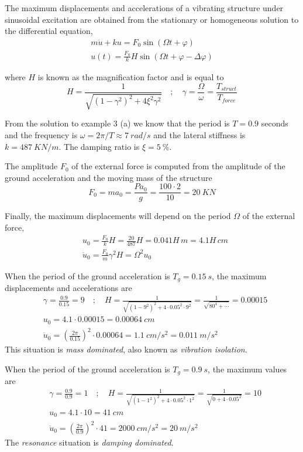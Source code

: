\begin{Answer}[ref={frame_ground_acceleration}]
The maximum displacements and accelerations of a vibrating structure under sinusoidal excitation are obtained from the stationary or homogeneous solution to the differential equation,
\begin{align*}
m\ddot{u} + ku = F_0\sin(\Omega t + \varphi) \\
u(t) = \frac{F_0}{k}H\sin(\Omega t + \varphi - \Delta\varphi)
\end{align*}

where $H$ is known as the magnification factor and is equal to
$$
H = \frac{1}{\sqrt{(1-\gamma^2)^2 + 4\xi^2\gamma^2}} \quad ; \quad
\gamma = \frac{\Omega}{\omega} = \frac{T_{struct}}{T_{force}}
$$

From the solution to example 3 (a) we know that the period is $T=0.9$ seconds and the frequency is $\omega = 2\pi/T \approx \SI{7}{rad/s}$ and the lateral stiffness is $k=\SI{487}{KN/m}$. The damping ratio is $\xi=\SI{5}{\%}$.

The amplitude $F_0$ of the external force is computed from the amplitude of the ground acceleration and the moving mass of the structure
$$
F_0 = ma_{0} = \frac{Pa_0}{g} = \frac{100\cdot2}{10} = \SI{20}{KN}
$$

Finally, the maximum displacements will depend on the period $\Omega$ of the external force,
\begin{align*}
&u_0 = \frac{F_0}{k}H = \frac{20}{487}H = 0.041H\,\si{m} = 4.1H\,\si{cm} \\
&\ddot{u}_0 = \frac{F_0}{m}\gamma^2H = \Omega^2u_0
\end{align*}


When the period of the ground acceleration is $T_g=\SI{0.15}{s}$, the maximum displacements and accelerations are
\begin{align*}
&\gamma = \frac{0.9}{0.15} = 9 \quad ; \quad
H = \frac{1}{\sqrt{(1-9^2)^2 + 4\cdot 0.05^2\cdot 9^2}} = \frac{1}{\sqrt{80^4 + \cdots}} = 0.00015 \\
&u_0 = 4.1\cdot 0.00015 = \SI{0.00064}{cm} \\
&\ddot{u}_0 = \left(\frac{2\pi}{0.15}\right)^2 \cdot 0.00064 = \SI{1.1}{cm/s^2} = \SI{0.011}{m/s^2}
\end{align*}
This situation is \emph{mass dominated}, also known as \emph{vibration isolation}.

When the period of the ground acceleration is $T_g=\SI{0.9}{s}$, the maximum values are
\begin{align*}
&\gamma = \frac{0.9}{0.9} = 1 \quad ; \quad
H = \frac{1}{\sqrt{(1-1^2)^2 + 4\cdot 0.05^2\cdot 1^2}} = \frac{1}{\sqrt{0 + 4\cdot 0.05^2}} = 10 \\
&u_0 = 4.1\cdot 10 = \SI{41}{cm} \\
&\ddot{u}_0 = \left(\frac{2\pi}{0.9}\right)^2 \cdot 41 = \SI{2000}{cm/s^2} = \SI{20}{m/s^2}
\end{align*}
The \emph{resonance} situation is \emph{damping dominated}.


\end{Answer}
